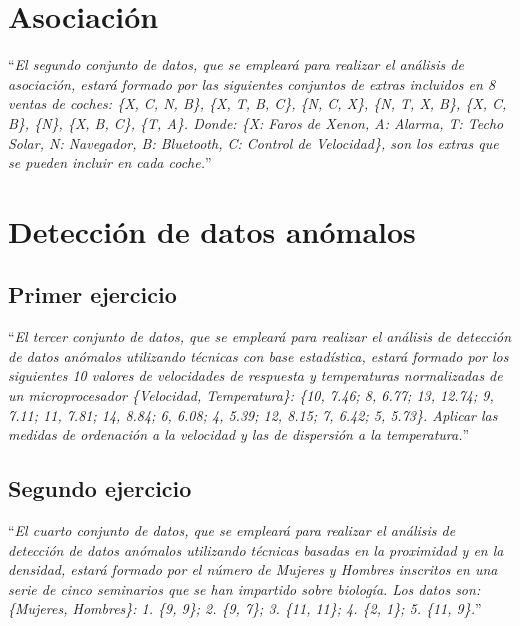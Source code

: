 \documentclass[12pt]{report}\usepackage[]{graphicx}\usepackage[dvipsnames]{xcolor}
\begin{document}
		\section{Asociación}
		
			``\textit{El segundo conjunto de datos, que se empleará para realizar el análisis de asociación, estará formado por las siguientes conjuntos de extras incluidos en 8 ventas de coches: \{X, C, N, B\}, \{X, T, B, C\}, \{N, C, X\}, \{N, T, X, B\}, \{X, C, B\}, \{N\}, \{X, B, C\}, \{T, A\}. Donde: \{X: Faros de Xenon, A: Alarma, T: Techo Solar, N: Navegador, B: Bluetooth, C: Control de Velocidad\}, son los extras que se pueden incluir en cada coche.}''
		
		\section{Detección de datos anómalos}
		
			\subsection{Primer ejercicio}
			
				``\textit{El tercer conjunto de datos, que se empleará para realizar el análisis de detección de datos anómalos utilizando técnicas con base estadística, estará formado por los siguientes 10 valores de velocidades de respuesta y temperaturas normalizadas de un microprocesador \{Velocidad, Temperatura\}: \{10, 7.46; 8, 6.77; 13, 12.74; 9, 7.11; 11, 7.81; 14, 8.84; 6, 6.08; 4, 5.39; 12, 8.15; 7, 6.42; 5, 5.73\}. Aplicar las medidas de ordenación a la velocidad y las de dispersión a la temperatura.}''
			
			\subsection{Segundo ejercicio}
			
				``\textit{El cuarto conjunto de datos, que se empleará para realizar el análisis de detección de datos anómalos utilizando técnicas basadas en la proximidad y en la densidad, estará formado por el número de Mujeres y Hombres inscritos en una serie de cinco seminarios que se han impartido sobre biología. Los datos son: \{Mujeres, Hombres\}: 1. \{9, 9\}; 2. \{9, 7\}; 3. \{11, 11\}; 4. \{2, 1\}; 5. \{11, 9\}.}''
	
\end{document}
